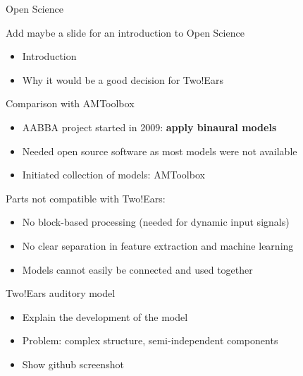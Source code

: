 \documentclass{beamer}
\begin{document}
\begin{frame}{Open Science}

    Add maybe a slide for an introduction to Open Science

    \begin{itemize}
        \item Introduction
        \item Why it would be a good decision for Two!Ears
    \end{itemize}

\end{frame}

\begin{frame}{Comparison with AMToolbox}

    \begin{itemize}
        \item AABBA project started in 2009: \textbf{apply binaural models}
        \item Needed open source software as most models were not available
        \item Initiated collection of models: AMToolbox
    \end{itemize}

    \vspace{1cm}

    Parts not compatible with Two!Ears:
    \begin{itemize}
        \item No block-based processing (needed for dynamic input signals)
        \item No clear separation in feature extraction and machine learning
        \item Models cannot easily be connected and used together
    \end{itemize}

\end{frame}

\begin{frame}{Two!Ears auditory model}

    \begin{itemize}
        \item Explain the development of the model
        \item Problem: complex structure, semi-independent components
        \item Show github screenshot
    \end{itemize}

\end{frame}
\end{document}
